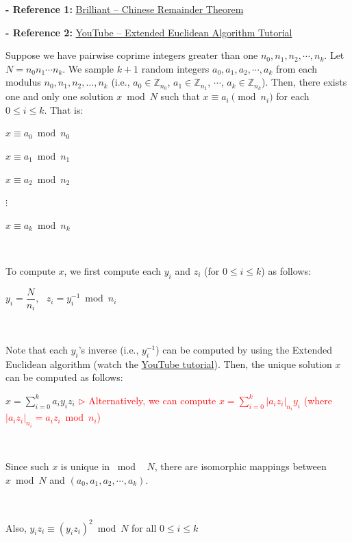 \textbf{- Reference 1:} 
\href{https://brilliant.org/wiki/chinese-remainder-theorem/}{Brilliant -- Chinese Remainder Theorem}~\cite{crt}

\noindent \textbf{- Reference 2:} 
\href{https://www.youtube.com/watch?v=fz1vxq5ts5I}{YouTube -- Extended Euclidean Algorithm Tutorial}



\begin{tcolorbox}[title={\textbf{\tboxtheorem{\ref*{sec:chinese-remainder}.1} Chinese Remainder Theorem}}]

Suppose we have pairwise coprime integers greater than one $n_0, n_1, n_2, \cdots, n_k$. Let $N = n_0 n_1 \cdots n_k$. We sample $k + 1$ random integers $a_0, a_1, a_2, \cdots, a_k$ from each modulus $n_0, n_1, n_2, \dots, n_k$ (i.e., $a_0 \in \mathbb{Z}_{n_0}$, $a_1 \in \mathbb{Z}_{n_1}$, $\cdots$, $a_k \in \mathbb{Z}_{n_k}$). Then, there exists one and only one solution $x \bmod N$ such that $x \equiv a_i \pmod{n_i}$ for each $0 \le i \le k$. That is:

\text{ } $x \equiv a_0 \bmod n_0$

\text{ } $x \equiv a_1 \bmod n_1$

\text{ } $x \equiv a_2 \bmod n_2$

\text{ } \text{ } $\vdots$

\text{ } $x \equiv a_k \bmod n_k$

$ $

To compute $x$, we first compute each $y_i$ and $z_i$ (for $0 \leq i \leq k$) as follows:

$y_i = \dfrac{N}{n_i}, \text{ } z_i = y_i^{-1} \bmod n_i$

$ $

Note that each $y_i$'s inverse (i.e., $y_i^{-1}$) can be computed by using the Extended Euclidean algorithm (watch the \href{https://www.youtube.com/watch?v=fz1vxq5ts5I}{YouTube tutorial}). Then, the unique solution $x$ can be computed as follows:

$x = \sum\limits_{i=0}^k a_i y_i z_i $ \textcolor{red}{ $\rhd$ Alternatively, we can compute $ x = \sum\limits_{i=0}^k |a_i z_i|_{n_i} y_i$ (where $|a_i z_i|_{n_i} = a_i z_i \bmod n_i$)}

$ $

Since such $x$ is unique in $\bmod \text{ } N$, there are isomorphic mappings between $x \bmod N$ and $(a_0, a_1, a_2, \cdots, a_k)$.

$ $

Also, $y_iz_i \equiv (y_iz_i)^2 \bmod N$  \text{ } for all $0 \leq i \leq k$ 
\end{tcolorbox}

